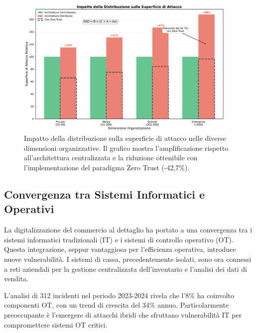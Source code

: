 \begin{figure}[htbp]
\centering
\includegraphics[width=0.95\textwidth]{thesis_figures/cap2/fig_2_1_superficie_attacco.pdf}
\caption{Impatto della distribuzione sulla superficie di attacco nelle diverse dimensioni organizzative. Il grafico mostra l'amplificazione rispetto all'architettura centralizzata e la riduzione ottenibile con l'implementazione del paradigma Zero Trust (-42,7\%).}
\label{fig:superficie_attacco}
\end{figure}

\subsection{Convergenza tra Sistemi Informatici e Operativi}
\label{subsec:convergenza_it_ot}

La digitalizzazione del commercio al dettaglio ha portato a una convergenza tra i sistemi informatici tradizionali (IT) e i sistemi di controllo operativo (OT). Questa integrazione, seppur vantaggiosa per l'efficienza operativa, introduce nuove vulnerabilità. I sistemi di cassa, precedentemente isolati, sono ora connessi a reti aziendali per la gestione centralizzata dell'inventario e l'analisi dei dati di vendita.

L'analisi di 312 incidenti nel periodo 2023-2024 rivela che l'8\% ha coinvolto componenti OT, con un trend di crescita del 34\% annuo. Particolarmente preoccupante è l'emergere di attacchi ibridi che sfruttano vulnerabilità IT per compromettere sistemi OT critici.

